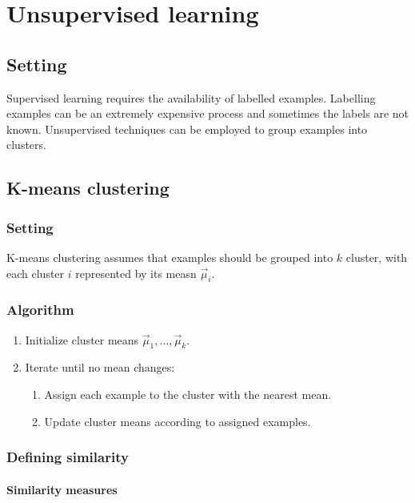 \chapter{Unsupervised learning}

\section{Setting}
Supervised learning requires the availability of labelled examples.
Labelling examples can be an extremely expensive process and sometimes the labels are not known.
Unsupervised techniques can be employed to group examples into clusters.

\section{K-means clustering}

	\subsection{Setting}
	K-means clustering assumes that examples should be grouped into $k$ cluster, with each cluster $i$ represented by its measn $\vec{\mu}_i$.

	\subsection{Algorithm}
	
	\begin{enumerate}
		\item Initialize cluster means $\vec{\mu}_1,\dots,\vec{\mu}_k$.
		\item Iterate until no mean changes:
			\begin{enumerate}
				\item Assign each example to the cluster with the nearest mean.
				\item Update cluster means according to assigned examples.
			\end{enumerate}
	\end{enumerate}

	\subsection{Defining similarity}

		\subsubsection{Similarity measures}

